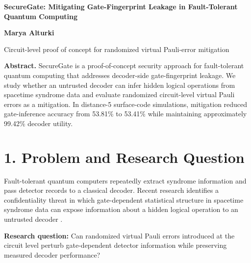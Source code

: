 \documentclass[9pt,a4paper]{article}
\begin{document}
\begin{center}
{\color{SGDark}\bfseries\Large SecureGate: Mitigating Gate-Fingerprint Leakage in Fault-Tolerant Quantum Computing}\par
\vspace{2pt}
{\large\bfseries Marya Alturki}\par
\vspace{2pt}
{\small Circuit-level proof of concept for randomized virtual Pauli-error mitigation}
\end{center}

\begin{boxg}
\textbf{Abstract.} SecureGate is a proof-of-concept security approach for fault-tolerant quantum computing that addresses decoder-side gate-fingerprint leakage. We study whether an untrusted decoder can infer hidden logical operations from spacetime syndrome data and evaluate randomized circuit-level virtual Pauli errors as a mitigation. In distance-5 surface-code simulations, mitigation reduced gate-inference accuracy from 53.81\% to 53.41\% while maintaining approximately 99.42\% decoder utility.
\end{boxg}

\section*{1. Problem and Research Question}
Fault-tolerant quantum computers repeatedly extract syndrome information and pass detector records to a classical decoder. Recent research identifies a confidentiality threat in which gate-dependent statistical structure in spacetime syndrome data can expose information about a hidden logical operation to an untrusted decoder \cite{shukla2026}.

\begin{boxm}\centering\textbf{Research question:} Can randomized virtual Pauli errors introduced at the circuit level perturb gate-dependent detector information while preserving measured decoder performance?\end{boxm}
\end{document}
